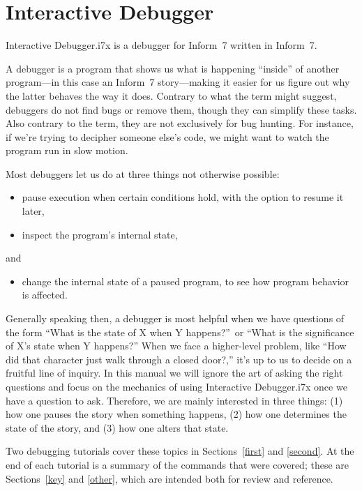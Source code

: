 \documentclass{book}
\newcommand{\lastpagebreak}{\vfill\pagebreak}
\newcommand{\impatiencechapter}[1]{\chapter{#1}\addcontentsline{toi}{chapter}{#1}}
\begin{document}
\lastpagebreak

\impatiencechapter{Interactive Debugger}
\label{interactive-debugger}

Interactive Debugger.i7x is a debugger for Inform~7 written in Inform~7.

\label{what}
A debugger is a program that shows us what is happening ``inside'' of another
program---in this case an Inform~7 story---making it easier for us figure out
why the latter behaves the way it does.  Contrary to what the term might
suggest, debuggers do not find bugs or remove them, though they can simplify
these tasks.  Also contrary to the term, they are not exclusively for bug
hunting.  For instance, if we're trying to decipher someone else's code, we
might want to watch the program run in slow motion.

Most debuggers let us do at three things not otherwise possible:

\begin{itemize}
  \item{pause execution when certain conditions hold, with the option to resume
    it later,}
  \item{inspect the program's internal state,}
\end{itemize}

\noindent and

\begin{itemize}
  \item{change the internal state of a paused program, to see how program
    behavior is affected.}
\end{itemize}

\noindent Generally speaking then, a debugger is most helpful when we have
questions of the form ``What is the state of X when Y happens?''\ or ``What is
the significance of X's state when Y happens?''  When we face a higher-level
problem, like ``How did that character just walk through a closed door?,'' it's
up to us to decide on a fruitful line of inquiry.  In this manual we will ignore
the art of asking the right questions and focus on the mechanics of using
Interactive Debugger.i7x once we have a question to ask.  Therefore, we are
mainly interested in three things: (1) how one pauses the story when something
happens, (2) how one determines the state of the story, and (3) how one alters
that state.

Two debugging tutorials cover these topics in Sections~\ref{first} and
\ref{second}.  At the end of each tutorial is a summary of the commands that
were covered; these are Sections~\ref{key} and \ref{other}, which are intended
both for review and reference.
\end{document}
